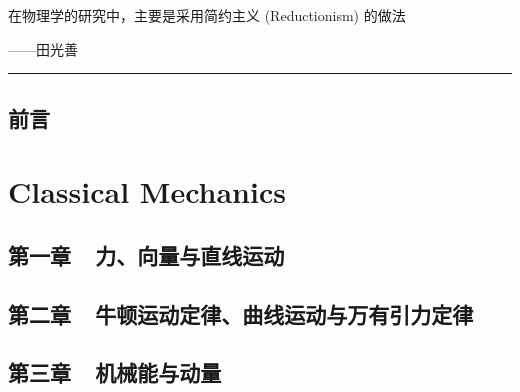 \documentclass[12pt,a4paper]{book}
\begin{document}
\renewcommand{\contentsname}{\vspace{0cm} 目录 \vspace{-2cm}}

\begin{titlepage}
\vspace*{2cm}

\noindent
\vspace*{0.5cm}

\vspace{1.5cm}
\epigraph{\fangsong 在物理学的研究中，主要是采用简约主义 (Reductionism) 的做法}%
{\kaishu ——田光善}
\null\vfill
\vspace*{1cm}
\noindent
\hfill
\begin{minipage}{0.7\linewidth}
    \begin{flushright}
        \printauthor %
    \end{flushright}
\end{minipage}
%
\begin{minipage}{0.02\linewidth}
    \rule{1pt}{70pt}
\end{minipage}
\titlepagedecoration
\end{titlepage}


\tableofcontents

\graphicspath{{高中物理插图/}}
\fangsong 

\chapter*{前言}


\part{Classical Mechanics}

\chapter{第一章~~力、向量与直线运动}


\chapter{第二章~~牛顿运动定律、曲线运动与万有引力定律}


\chapter{第三章~~机械能与动量}

\end{document}
